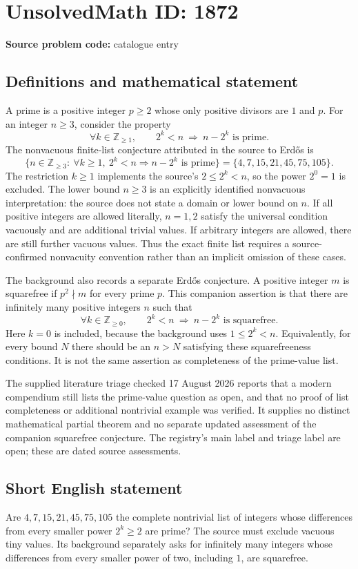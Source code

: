 \documentclass[11pt]{article}
\newcommand{\Z}{\mathbb{Z}}
\begin{document}
\section*{UnsolvedMath ID: 1872}
\textbf{Source problem code:} catalogue entry
\subsection{Definitions and mathematical statement}
A prime is a positive integer $p\ge2$ whose only positive divisors are $1$ and $p$. For an integer $n\ge3$, consider the property
\[
 \forall k\in\Z_{\ge1},\qquad 2^k<n\ \Longrightarrow\ n-2^k\text{ is prime}.
\]
The nonvacuous finite-list conjecture attributed in the source to Erd\H{o}s is
\[
 \bigl\{n\in\Z_{\ge3}:\ \forall k\ge1,\
 2^k<n\Longrightarrow n-2^k\text{ is prime}\bigr\}
 =\{4,7,15,21,45,75,105\}.
\]
The restriction $k\ge1$ implements the source's $2\le2^k<n$, so the power $2^0=1$ is excluded. The lower bound $n\ge3$ is an explicitly identified nonvacuous interpretation: the source does not state a domain or lower bound on $n$. If all positive integers are allowed literally, $n=1,2$ satisfy the universal condition vacuously and are additional trivial values. If arbitrary integers are allowed, there are still further vacuous values. Thus the exact finite list requires a source-confirmed nonvacuity convention rather than an implicit omission of these cases.

The background also records a separate Erd\H{o}s conjecture. A positive integer $m$ is squarefree if $p^2\nmid m$ for every prime $p$. This companion assertion is that there are infinitely many positive integers $n$ such that
\[
 \forall k\in\Z_{\ge0},\qquad 2^k<n\ \Longrightarrow\
 n-2^k\text{ is squarefree}.
\]
Here $k=0$ is included, because the background uses $1\le2^k<n$. Equivalently, for every bound $N$ there should be an $n>N$ satisfying these squarefreeness conditions. It is not the same assertion as completeness of the prime-value list.

The supplied literature triage checked 17 August 2026 reports that a modern compendium still lists the prime-value question as open, and that no proof of list completeness or additional nontrivial example was verified. It supplies no distinct mathematical partial theorem and no separate updated assessment of the companion squarefree conjecture. The registry's main label and triage label are open; these are dated source assessments.
\subsection{Short English statement}
Are $4,7,15,21,45,75,105$ the complete nontrivial list of integers whose differences from every smaller power $2^k\ge2$ are prime? The source must exclude vacuous tiny values. Its background separately asks for infinitely many integers whose differences from every smaller power of two, including $1$, are squarefree.
\end{document}
